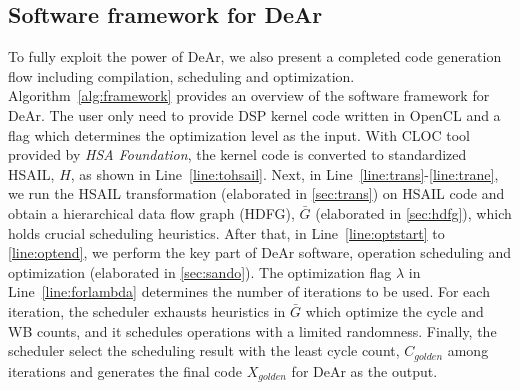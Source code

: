\subsection{Software framework for DeAr}
\label{sec:software:framework}
To fully exploit the power of DeAr, we also present a completed code generation flow including compilation, scheduling and optimization.
Algorithm~\ref{alg:framework} provides an overview of the software framework for DeAr. 
The user only need to provide DSP kernel code written in OpenCL and a flag which determines the optimization level as the input.
With CLOC \cite{cloc} tool provided by \textit{HSA Foundation}, the kernel code is converted to standardized HSAIL, $H$, as shown in Line~\ref{line:tohsail}.
Next, in Line~\ref{line:trans}-\ref{line:trane}, 
we run the HSAIL transformation (elaborated in \ref{sec:trans}) on HSAIL code and obtain a hierarchical data flow graph (HDFG), 
$\bar{G}$ (elaborated in \ref{sec:hdfg}), which holds crucial scheduling heuristics.
After that, in Line~\ref{line:optstart} to \ref{line:optend}, we perform the key part of DeAr software, 
operation scheduling and optimization (elaborated in \ref{sec:sando}).
The optimization flag $\lambda$ in Line~\ref{line:forlambda} determines the number of iterations to be used.
For each iteration, the scheduler exhausts heuristics in $\bar{G}$ which optimize the cycle and WB counts, 
and it schedules operations with a limited randomness.
Finally, the scheduler select the scheduling result with the least cycle count, 
$C_{golden}$ among iterations and generates the final code $X_{golden}$ for DeAr as the output.
